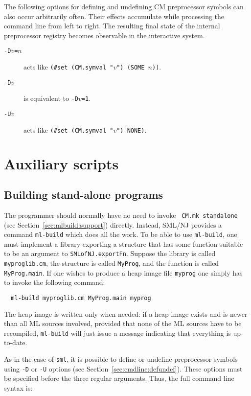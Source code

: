 \documentclass[titlepage,letterpaper]{article}
\begin{document}
The following options for defining and undefining CM preprocessor
symbols can also occur arbitrarily often.  Their effects accumulate
while processing the command line from left to right.  The resulting
final state of the internal preprocessor registry becomes observable
in the interactive system.

\begin{description}
\item[{\tt -D$v$=$n$}] acts like {\tt (\#set (CM.symval "$v$") (SOME $n$))}.
\item[{\tt -D$v$}] is equivalent to {\tt -D$v$=1}.
\item[{\tt -U$v$}] acts like {\tt (\#set (CM.symval "$v$") NONE)}.
\end{description}

\section{Auxiliary scripts}

\subsection{Building stand-alone programs}
\label{sec:mlbuild}

The programmer should normally have no need to invoke {\tt
CM.mk\_standalone} (see Section~\ref{sec:mlbuild:support}) directly.
Instead, SML/NJ provides a command {\tt ml-build} which does all the
work.  To be able to use {\tt ml-build}, one must implement a library
exporting a structure that has some function suitable to be an
argument to {\tt SMLofNJ.exportFn}.  Suppose the library is called
{\tt myproglib.cm}, the structure is called {\tt MyProg}, and the
function is called {\tt MyProg.main}.  If one wishes to produce a heap
image file {\tt myprog} one simply has to invoke the following
command:

\begin{verbatim}
  ml-build myproglib.cm MyProg.main myprog
\end{verbatim}

The heap image is written only when needed: if a heap image exists and
is newer than all ML sources involved, provided that none of the ML
sources have to be recompiled, {\tt ml-build} will just issue a
message indicating that everything is up-to-date.

As in the case of {\tt sml}, it is possible to define or undefine
preprocessor symbols using {\tt -D} or {\tt -U} options (see
Section~\ref{sec:cmdline:defundef}).  These options must be specified
before the three regular arguments.  Thus, the full command line
syntax is:
\end{document}
